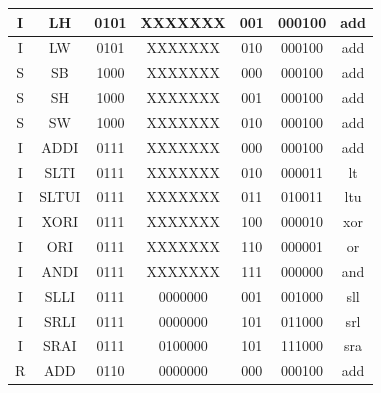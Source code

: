 \documentclass[12pt,a4paper]{report}
\begin{document}
\begin{table}[!ht]
\begin{tabular}{|c|c|c|c|c|c|c|}
I                                                              & LH                 & 0101  & XXXXXXX & 001    & 000100 & add          \\ \hline
I                                                              & LW                 & 0101  & XXXXXXX & 010    & 000100 & add          \\ \hline
S                                                              & SB                 & 1000  & XXXXXXX & 000    & 000100 & add          \\ \hline
S                                                              & SH                 & 1000  & XXXXXXX & 001    & 000100 & add          \\ \hline
S                                                              & SW                 & 1000  & XXXXXXX & 010    & 000100 & add          \\ \hline
I                                                              & ADDI               & 0111  & XXXXXXX & 000    & 000100 & add          \\ \hline
I                                                              & SLTI               & 0111  & XXXXXXX & 010    & 000011 & lt           \\ \hline
I                                                              & SLTUI              & 0111  & XXXXXXX & 011    & 010011 & ltu          \\ \hline
I                                                              & XORI               & 0111  & XXXXXXX & 100    & 000010 & xor          \\ \hline
I                                                              & ORI        & 0111  & XXXXXXX & 110    & 000001 & or           \\ \hline
I                                                              & ANDI               & 0111  & XXXXXXX & 111    & 000000 & and          \\ \hline
I                                                              & SLLI               & 0111  & 0000000 & 001    & 001000 & sll          \\ \hline
I                                                              & SRLI               & 0111  & 0000000 & 101    & 011000 & srl          \\ \hline
I                                                              & SRAI               & 0111  & 0100000 & 101    & 111000 & sra          \\ \hline
R                                                              & ADD                & 0110  & 0000000 & 000    & 000100 & add          \\ \hline

\end{tabular}
\end{table}
\end{document}
